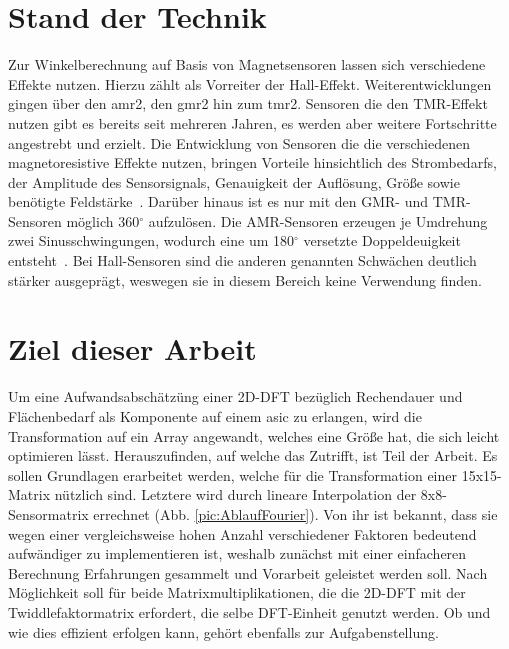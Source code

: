 \section{Stand der Technik}

Zur Winkelberechnung auf Basis von Magnetsensoren lassen sich verschiedene Effekte nutzen. Hierzu zählt als Vorreiter der Hall-Effekt. Weiterentwicklungen gingen über den \gls{amr2}, den \gls{gmr2} hin zum \gls{tmr2}. Sensoren die den TMR-Effekt nutzen gibt es bereits seit mehreren Jahren, es werden aber weitere Fortschritte angestrebt und erzielt. 
Die Entwicklung von Sensoren die die verschiedenen magnetoresistive Effekte nutzen, bringen Vorteile hinsichtlich des Strombedarfs, der Amplitude des Sensorsignals, Genauigkeit der Auflösung, Größe sowie benötigte Feldstärke~\autocite[2]{magSensTechOverview}. Darüber hinaus ist es nur mit den GMR- und TMR-Sensoren möglich 360${}^\circ$ aufzulösen. Die AMR-Sensoren erzeugen je Umdrehung zwei Sinusschwingungen, wodurch eine um 180${}^\circ$ versetzte Doppeldeuigkeit entsteht~\autocite{tsukakoshi2017tmrgmr}. Bei Hall-Sensoren sind die anderen genannten Schwächen deutlich stärker ausgeprägt, weswegen sie in diesem Bereich keine Verwendung finden.






\section{Ziel dieser Arbeit}
Um eine Aufwandsabschätzüng einer 2D-DFT bezüglich Rechendauer und Flächenbedarf als Komponente auf einem  \gls{asic} zu erlangen, wird die Transformation auf ein Array angewandt, welches eine Größe 
hat, die sich leicht optimieren lässt. Herauszufinden, auf welche das Zutrifft, ist Teil der Arbeit. 
Es sollen Grundlagen erarbeitet werden, welche für die Transformation einer
15x15-Matrix nützlich sind. Letztere wird durch lineare Interpolation der 8x8-Sensormatrix errechnet (Abb. \ref{pic:AblaufFourier}). Von ihr ist bekannt, dass sie wegen einer vergleichsweise hohen Anzahl verschiedener Faktoren bedeutend
aufwändiger zu implementieren ist, weshalb zunächst mit einer einfacheren Berechnung Erfahrungen gesammelt und Vorarbeit geleistet werden soll.
Nach Möglichkeit soll für beide Matrixmultiplikationen, die die 2D-DFT mit der Twiddlefaktormatrix erfordert, die selbe DFT-Einheit genutzt werden. Ob und wie dies effizient erfolgen kann,
gehört ebenfalls zur Aufgabenstellung.
